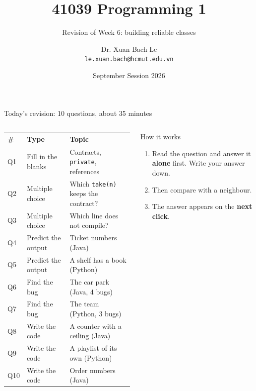 \documentclass[aspectratio=169]{beamer}
\title[41039 Programming 1 --- Revision of Week 6]{41039 Programming 1}
\subtitle{Revision of Week 6: building reliable classes}
\author{Dr. Xuan-Bach Le\\ \small\texttt{le.xuan.bach@hcmut.edu.vn}}
\institute{\small Faculty of Computer Science and Engineering, HCMUT}
\date{September Session 2026}
\newcommand{\code}[1]{\texttt{#1}}
\begin{document}
\begin{frame}[plain]
  \titlepage
\end{frame}

\begin{frame}{Today's revision: 10 questions, about 35 minutes}
  \begin{columns}[T,onlytextwidth]
    {\small
    \renewcommand{\arraystretch}{1.18}
    \begin{tabular}{@{}l@{\hspace{0.8em}}l@{\hspace{0.8em}}l@{}}
      \toprule
      \textbf{\#} & \textbf{Type} & \textbf{Topic}\\
      \midrule
      Q1  & Fill in the blanks & Contracts, \code{private}, references\\
      Q2  & Multiple choice    & Which \code{take(n)} keeps the contract?\\
      Q3  & Multiple choice    & Which line does not compile?\\
      Q4  & Predict the output & Ticket numbers (Java)\\
      Q5  & Predict the output & A shelf has a book (Python)\\
      Q6  & Find the bug       & The car park (Java, 4 bugs)\\
      Q7  & Find the bug       & The team (Python, 3 bugs)\\
      Q8  & Write the code     & A counter with a ceiling (Java)\\
      Q9  & Write the code     & A playlist of its own (Python)\\
      Q10 & Write the code     & Order numbers (Java)\\
      \bottomrule
    \end{tabular}}
    \begin{discussionbox}{How it works}
      \small\raggedright
      \begin{enumerate}[itemsep=0.3em, topsep=0.1em, leftmargin=1.2em]
        \item Read the question and answer it \textbf{alone} first. Write your answer
              down.
        \item Then compare with a neighbour.
        \item The answer appears on the \textbf{next click}.
      \end{enumerate}
    \end{discussionbox}
  \end{columns}
\end{frame}
\end{document}
